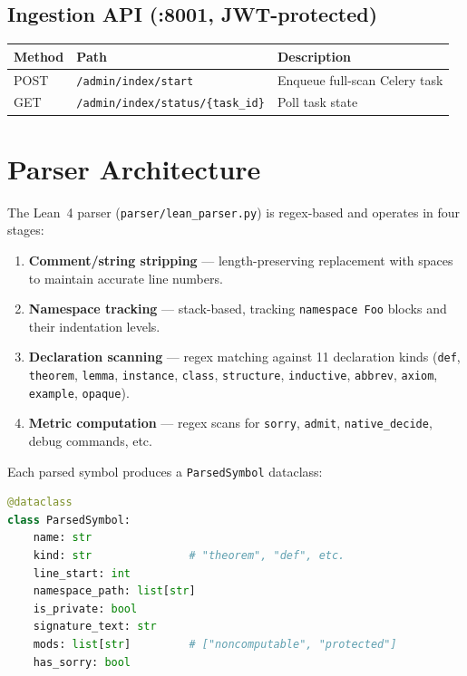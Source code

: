 \documentclass[11pt,a4paper]{article}
\begin{document}
\subsection{Ingestion API (:8001, JWT-protected)}

\begin{longtable}{@{}llp{7.5cm}@{}}
\toprule
\textbf{Method} & \textbf{Path} & \textbf{Description} \\
\midrule
\endhead
POST & \texttt{/admin/index/start}              & Enqueue full-scan Celery task \\
GET  & \texttt{/admin/index/status/\{task\_id\}} & Poll task state \\
\bottomrule
\end{longtable}

\section{Parser Architecture}

The Lean~4 parser (\texttt{parser/lean\_parser.py}) is regex-based and
operates in four stages:

\begin{enumerate}
  \item \textbf{Comment/string stripping} --- length-preserving replacement
        with spaces to maintain accurate line numbers.
  \item \textbf{Namespace tracking} --- stack-based, tracking
        \texttt{namespace Foo} blocks and their indentation levels.
  \item \textbf{Declaration scanning} --- regex matching against 11 declaration
        kinds (\texttt{def}, \texttt{theorem}, \texttt{lemma}, \texttt{instance},
        \texttt{class}, \texttt{structure}, \texttt{inductive}, \texttt{abbrev},
        \texttt{axiom}, \texttt{example}, \texttt{opaque}).
  \item \textbf{Metric computation} --- regex scans for \texttt{sorry},
        \texttt{admit}, \texttt{native\_decide}, debug commands, etc.
\end{enumerate}

Each parsed symbol produces a \texttt{ParsedSymbol} dataclass:

\begin{lstlisting}[language=Python, caption={ParsedSymbol dataclass}]
@dataclass
class ParsedSymbol:
    name: str
    kind: str               # "theorem", "def", etc.
    line_start: int
    namespace_path: list[str]
    is_private: bool
    signature_text: str
    mods: list[str]         # ["noncomputable", "protected"]
    has_sorry: bool
\end{lstlisting}
\end{document}
